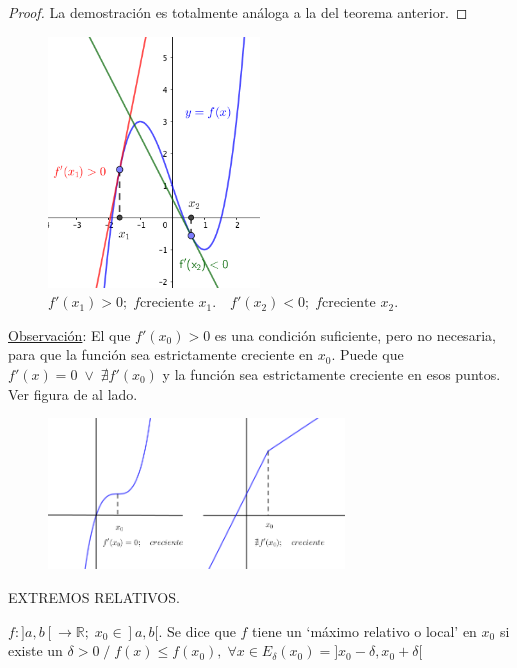	\begin{proof}
		La demostración es totalmente análoga a la del teorema anterior.
	\end{proof}
	
	\begin{figure}[H]
		\centering
		\includegraphics[width=0.5\textwidth]{imagenes/imagenes05/T05IM03.png}
		\caption{$f'(x_1)>0; \; f \mbox{creciente } x_1. \quad  f'(x_2)<0; \; f \mbox{creciente } x_2. $}
	\end{figure}
	
	\underline{Observación}: El que $f'(x_0)>0$ es una condición suficiente, pero no necesaria, para que la función sea estrictamente creciente en $x_0$. Puede que $f'(x)=0 \; \vee \; \nexists f'(x_0) $ y la función sea estrictamente creciente en esos puntos. Ver figura de al lado.
	
	\begin{figure}[H]
		\centering
		\includegraphics[width=0.7\textwidth]{imagenes/imagenes05/T05IM04.png}
	\end{figure}

	EXTREMOS RELATIVOS.
	
	\begin{defi}
		$f:]a,b[\to \mathbb R; \; x_0\in ]a,b[$. Se dice que $f$ tiene un `máximo relativo o local' en $x_0$ si existe un $\delta>0 \; / \; f(x)\le f(x_0), \; \forall x \in E_{\delta}(x_0)=]x_0-\delta, x_0+\delta[$
	\end{defi}
	
